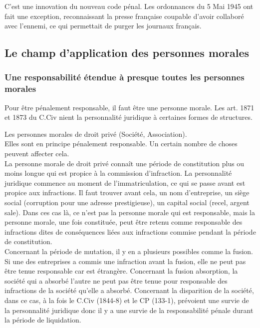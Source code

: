 \documentclass[10pt, a4paper, openany]{book}
\begin{document}
C'est une innovation du nouveau code pénal. Les ordonnances du 5 Mai 1945 ont fait une exception, reconnaissant la presse française coupable d'avoir collaboré avec l'ennemi, ce qui permettait de purger les journaux français. 

\subsection{Le champ d'application des personnes morales}

\subsubsection{Une responsabilité étendue à presque toutes les personnes morales}

Pour être pénalement responsable, il faut être une personne morale. Les art. 1871 et 1873 du C.Civ nient la personnalité juridique à certaines formes de structures. 


Les personnes morales de droit privé (Société, Association). \\
Elles sont en principe pénalement responsable. Un certain nombre de choses peuvent affecter cela. \\
La personne morale de droit privé connaît une période de constitution plus ou moins longue qui est propice à la commission d'infraction. La personnalité juridique commence au moment de l'immatriculation, ce qui se passe avant est propice aux infractions. Il faut trouver avant cela, un nom d'entreprise, un siège social (corruption pour une adresse prestigieuse), un capital social (recel, argent sale). Dans ces cas là, ce n'est pas la personne morale qui est responsable, mais la personne morale, une fois constituée, peut être retenu comme responsable des infractions dites de conséquences liées aux infractions commise pendant la période de constitution. \\
Concernant la période de mutation, il y en a plusieurs possibles comme la fusion. Si une des entreprises a commis une infraction avant la fusion, elle ne peut pas être tenue responsable car est étrangère. Concernant la fusion absorption, la société qui a absorbé l'autre ne peut pas être tenue pour responsable des infractions de la société qu'elle a absorbé. Concernant la disparition de la société, dans ce cas, à la fois le C.Civ (1844-8) et le CP (133-1), prévoient une survie de la personnalité juridique donc il y a une survie de la responsabilité pénale durant la période de liquidation. 
\end{document}
